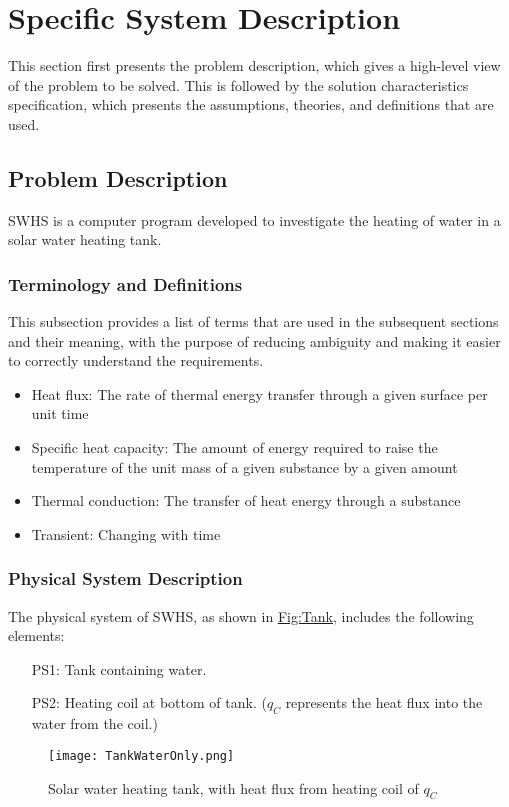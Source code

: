 \documentclass[12pt]{article}
\begin{document}
\section{Specific System Description}
\label{Sec:SpecSystDesc}
This section first presents the problem description, which gives a high-level view of the problem to be solved. This is followed by the solution characteristics specification, which presents the assumptions, theories, and definitions that are used.
\subsection{Problem Description}
\label{Sec:ProbDesc}
SWHS is a computer program developed to investigate the heating of water in a solar water heating tank.
\subsubsection{Terminology and Definitions}
\label{Sec:TermDefs}
This subsection provides a list of terms that are used in the subsequent sections and their meaning, with the purpose of reducing ambiguity and making it easier to correctly understand the requirements.
\begin{itemize}
\item{Heat flux: The rate of thermal energy transfer through a given surface per unit time}
\item{Specific heat capacity: The amount of energy required to raise the temperature of the unit mass of a given substance by a given amount}
\item{Thermal conduction: The transfer of heat energy through a substance}
\item{Transient: Changing with time}
\end{itemize}
\subsubsection{Physical System Description}
\label{Sec:PhysSyst}
The physical system of SWHS, as shown in \hyperref[Figure:Tank]{Fig:Tank}, includes the following elements:
\begin{itemize}
\item[PS1:]Tank containing water.
\item[PS2:]Heating coil at bottom of tank. (${q_{C}}$ represents the heat flux into the water from the coil.)
\end{itemize}
\begin{figure}
\begin{center}
\texttt{[image: TankWaterOnly.png]}
\caption{Solar water heating tank, with heat flux from heating coil of ${q_{C}}$}
\label{Figure:Tank}
\end{center}
\end{figure}
\end{document}
